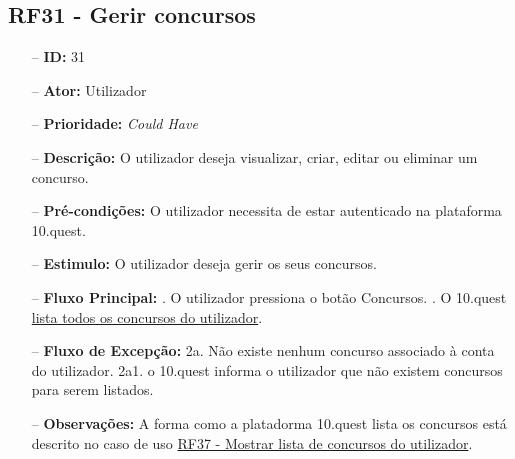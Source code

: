 \subsection{RF31 - Gerir concursos}
\begin{itemize}
	\item[--] \textbf{ID:} 31
	\item[--]  \textbf{Ator:} Utilizador
	\item[--]  \textbf{Prioridade:} \textit{Could Have}
	\item[--]  \textbf{Descrição:} O utilizador deseja visualizar, criar, editar ou eliminar um concurso.
	\item[--]  \textbf{Pré-condições:} O utilizador necessita de estar autenticado na plataforma 10.quest.
	\item[--]  \textbf{Estimulo:} O utilizador deseja gerir os seus concursos.
	\item[--]  \textbf{Fluxo Principal:} 
	. O utilizador pressiona o botão Concursos.
	. O 10.quest  \underline{lista todos os concursos do utilizador}.
	\item[--]  \textbf{Fluxo de Excepção:} 
	\subitem 2a. Não existe nenhum concurso associado à conta do utilizador.
	\subitem 2a1. o 10.quest informa o utilizador que não existem concursos para serem listados.
	\item[--]  \textbf{Observações:} A forma como a platadorma 10.quest lista os concursos está descrito no caso de uso \underline{RF37 - Mostrar lista de concursos do utilizador}.
\end{itemize}
\newpage

